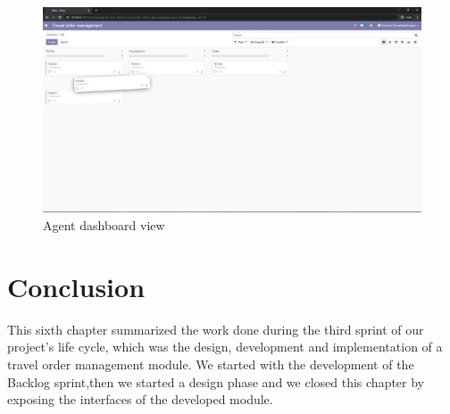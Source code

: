 \begin{figure}[H]
    \centering
    \includegraphics[scale=0.32]{img/c_agent_dash.png}
    \caption{Agent dashboard view}
    \label{fig:my_label}
\end{figure}






\section*{Conclusion}
  This sixth chapter summarized the work done during the third sprint of our project's life cycle, which was the design, development and implementation of a travel order management module. We started with the development of the Backlog sprint,then we started a design phase and we closed this chapter by exposing the interfaces of the developed module.